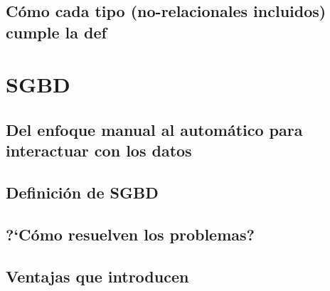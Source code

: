 \documentclass{beamer}
\begin{document}
\subsection{C\'omo cada tipo (no-relacionales incluidos) cumple la def}

\section{SGBD}
\subsection{Del enfoque manual al autom\'atico para interactuar con los datos}
\subsection{Definición de SGBD}
\subsection{?`C\'omo resuelven los problemas?}
\subsection{Ventajas que introducen}



\frame{\partpage}
\end{document}
